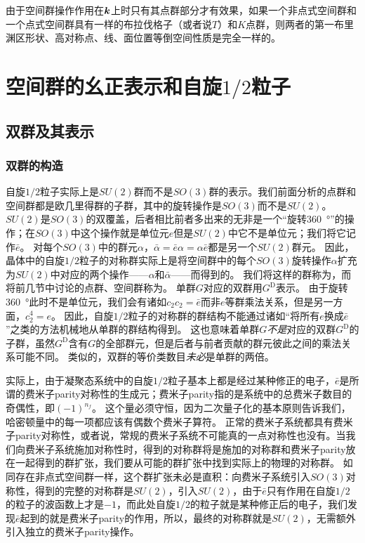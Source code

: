 由于空间群操作作用在$\vb*{k}$上时只有其点群部分才有效果，如果一个非点式空间群和一个点式空间群具有一样的布拉伐格子（或者说$T$）和$K$点群，则两者的第一布里渊区形状、高对称点、线、面位置等倒空间性质是完全一样的。

\section{空间群的幺正表示和自旋$1/2$粒子}

\subsection{双群及其表示}\label{sec:double-group}

\subsubsection{双群的构造}

自旋$1/2$粒子实际上是$SU(2)$群而不是$SO(3)$群的表示。我们前面分析的点群和空间群都是欧几里得群的子群，其中的旋转操作是$SO(3)$而不是$SU(2)$。
$SU(2)$是$SO(3)$的双覆盖，后者相比前者多出来的无非是一个“旋转\SI{360}{\degree}”的操作；在$SO(3)$中这个操作就是单位元$e$但是$SU(2)$中它不是单位元；我们将它记作$\bar{e}$。
对每个$SO(3)$中的群元$\alpha$，$\bar{\alpha} = \bar{e} \alpha = \alpha \bar{e}$都是另一个$SU(2)$群元。
因此，晶体中的自旋$1/2$粒子的对称群实际上是将空间群中的每个$SO(3)$旋转操作$\alpha$扩充为$SU(2)$中对应的两个操作——$\alpha$和$\bar{\alpha}$——而得到的。
我们将这样的群称为，而将前几节中讨论的点群、空间群称为。
单群$G$对应的双群用$G^\text{D}$表示。
由于旋转\SI{360}{\degree}此时不是单位元，我们会有诸如$c_2 c_2 = \bar{e}$而非$e$等群乘法关系，但是另一方面，$c_2^4 = e$。
因此，自旋$1/2$粒子的对称群的群结构不能通过诸如“将所有$e$换成$\bar{e}$”之类的方法机械地从单群的群结构得到。
这也意味着单群$G$\emph{不是}对应的双群$G^\text{D}$的子群，虽然$G^\text{D}$含有$G$的全部群元，但是后者与前者贡献的群元彼此之间的乘法关系可能不同。
类似的，双群的等价类数目\emph{未必}是单群的两倍。

实际上，由于凝聚态系统中的自旋$1/2$粒子基本上都是经过某种修正的电子，$\bar{e}$是所谓的费米子parity对称性的生成元；费米子parity指的是系统中的总费米子数目的奇偶性，即$(-1)^{n_f}$。
这个量必须守恒，因为二次量子化的基本原则告诉我们，哈密顿量中的每一项都应该有偶数个费米子算符。
正常的费米子系统都具有费米子parity对称性，或者说，常规的费米子系统不可能真的一点对称性也没有。当我们向费米子系统施加对称性时，得到的对称群将是施加的对称群和费米子parity放在一起得到的群扩张，我们要从可能的群扩张中找到实际上的物理的对称群。
如同存在非点式空间群一样，这个群扩张未必是直积：向费米子系统引入$SO(3)$对称性，得到的完整的对称群是$SU(2)$，引入$SU(2)$，由于$\bar{e}$只有作用在自旋$1/2$的粒子的波函数上才是$-1$，而此处自旋$1/2$的粒子就是某种修正后的电子，我们发现$\bar{e}$起到的就是费米子parity的作用，所以，最终的对称群就是$SU(2)$，无需额外引入独立的费米子parity操作。

